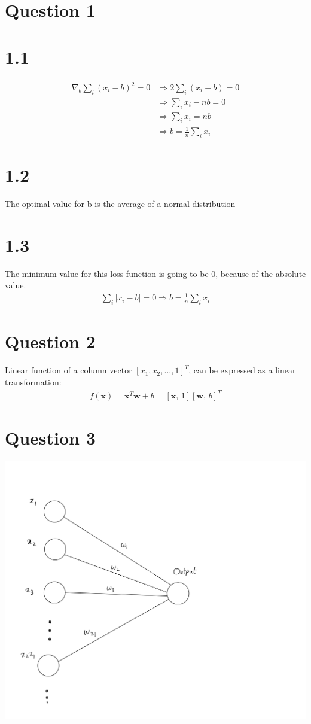 \documentclass{article}
\newcommand{\abs}[1]{| #1 |}
\DeclareMathOperator*{\1}{\mathbbm{1}}
\newcommand{\w}{\textbf{w}}
\newcommand{\x}{\textbf{x}}
\theoremstyle{definition}
\theoremstyle{remark}
\begin{document}
\section*{Question 1}
\section*{1.1}
\large
\begin{align*}
    \nabla_b \sum_i(x_i-b)^2 = 0
    & \Rightarrow 2 \sum_i (x_i - b) = 0 \\
    &\Rightarrow \sum_i x_i - nb = 0 \\ 
    & \Rightarrow \sum_i x_i = nb \\
    & \Rightarrow \boxed{ b = \frac{1}{n} \sum_i x_i}
\end{align*}        
\section*{1.2}
The optimal value for b is the average of a normal distribution
\section*{1.3}
The minimum value for this loss function is going to be 0, because of the 
absolute value.
\begin{align*}
 \sum_i \abs{x_i - b} = 0 \Rightarrow \boxed{b = \frac{1}{n} \sum_i x_i}
\end{align*}
\section*{Question 2}
 Linear function of a column vector $[x_1,x_2,...,1]^T$, can be expressed as a linear transformation:
 \begin{align*}
    f(\x) = \x^T\w + b = [\x, \, 1][\w, \, b]^T
 \end{align*}

\section*{Question 3}

\includegraphics[width=0.8\linewidth]{NN.png}
\end{document}

